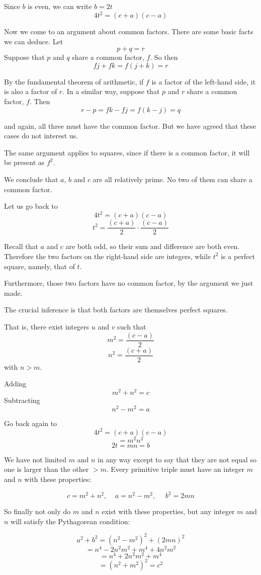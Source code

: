 \documentclass[11pt, oneside]{article}
\begin{document}
Since $b$ is even, we can write $b = 2t$
\[ 4t^2 = (c + a)(c - a) \]

Now we come to an argument about common factors.  There are some basic facts we can deduce.  Let
\[ p + q = r \]
Suppose that $p$ and $q$ share a common factor, $f$.  So then
\[ fj + fk = f(j + k) = r \] 

By the fundamental theorem of arithmetic, if $f$ is a factor of the left-hand side, it is also a factor of $r$.  In a similar way, suppose that $p$ and $r$ share a common factor, $f$.  Then
\[ r - p = fk - fj = f(k-j) = q \] 

and again, all three must have the common factor.  But we have agreed that these cases do not interest us.

The same argument applies to squares, since if there is a common factor, it will be present as $f^2$.

We conclude that $a$, $b$ and $c$ are all relatively prime.  No two of them can share a common factor.

Let us go back to 
\[ 4t^2 = (c + a)(c - a) \]
\[ t^2 = \frac{(c + a)}{2} \cdot \frac{(c - a)}{2} \]

Recall that $a$ and $c$ are both odd, so their sum and difference are both even.  Therefore
the two factors on the right-hand side are integers, while $t^2$ is a perfect square, namely, that of $t$.  

Furthermore, those two factors have no common factor, by the argument we just made.

The crucial inference is that both factors are themselves perfect squares.  

That is, there exist integers $u$ and $v$ such that
\[ m^2 =  \frac{(c - a)}{2} \]
\[ n^2 =  \frac{(c + a)}{2} \]
with $n > m$.

Adding
\[ m^2 + n^2 = c \]
Subtracting
\[ n^2 - m^2 = a \]

Go back again to
\[ 4t^2 = (c + a)(c - a) \]
\[ = m^2 n^2 \]
\[ 2t = mn = b \]

We have not limited $m$ and $n$ in any way except to say that they are not equal so one is larger than the other $ > m$.  Every primitive triple must have an integer $m$ and $n$ with these properties:

\[ c = m^2 + n^2, \ \ \ \ \ a = n^2 - m^2, \ \ \ \ \ \ b^2 = 2mn \]

So finally not only do $m$ and $n$ exist with these properties, but any integer $m$ and $n$ will satisfy the Pythagorean condition:

\[ a^2 + b^2 = (n^2 - m^2)^2 + (2mn)^2 \]
\[ = n^4 - 2n^2m^2 + m^4 + 4n^2m^2 \]
\[ = n^4 + 2n^2m^2 + m^4 \]
\[ = (n^2 + m^2)^2 = c^2 \]
\end{document}
